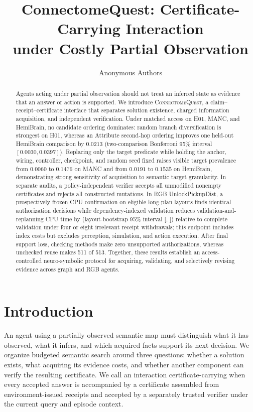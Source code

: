 \documentclass{article}
\title{ConnectomeQuest: Certificate-Carrying Interaction\\under Costly Partial Observation}
\author{Anonymous Authors}
\begin{document}
\maketitle

\begin{abstract}
Agents acting under partial observation should not treat an inferred state as
evidence that an answer or action is supported. We introduce
\textsc{ConnectomeQuest}, a claim--receipt--certificate interface that separates
solution existence, charged information acquisition, and independent
verification. Under matched access on H01, MANC, and HemiBrain, no candidate
ordering dominates: random branch diversification is strongest on H01, whereas
an Attribute second-hop ordering improves one held-out HemiBrain
comparison by $0.0213$ (two-comparison Bonferroni 95\% interval
$[0.0030,0.0397]$). Replacing only the target predicate while holding the
anchor, wiring, controller, checkpoint, and random seed fixed raises visible
target prevalence from $0.0060$ to $0.1476$ on MANC and
from $0.0191$ to $0.1535$ on HemiBrain, demonstrating strong sensitivity of acquisition to semantic target granularity. In separate audits, a policy-independent
verifier accepts all \VerifierReplayCertificates{} unmodified nonempty certificates
and rejects all \VerifierMutationAttempts{} constructed mutations. In RGB
UnlockPickupDist, a prospectively frozen CPU confirmation on
\AmortizedEligible{} eligible long-plan layouts finds identical authorization
decisions while dependency-indexed validation reduces validation-and-replanning
CPU time by \AmortizedReduction{} (layout-bootstrap 95\% interval
[\AmortizedReductionLow{}, \AmortizedReductionHigh{}]) relative to complete
validation under four or eight irrelevant receipt withdrawals; this endpoint
includes index costs but excludes perception, simulation, and action execution. After final
support loss, checking methods make zero unsupported authorizations, whereas
unchecked reuse makes 511 of 513. Together, these results establish an access-controlled neuro-symbolic protocol
for acquiring, validating, and selectively revising evidence across graph and
RGB agents.
\end{abstract}

\section{Introduction}

An agent using a partially observed semantic map must distinguish what it has
observed, what it infers, and which acquired facts support its next decision.
We organize budgeted semantic search around three questions: whether a solution
exists, what acquiring its evidence costs, and whether another component can
verify the resulting certificate.
We call an interaction certificate-carrying when every accepted answer is
accompanied by a certificate assembled from environment-issued receipts and
accepted by a separately trusted verifier under the current query and episode context.
\end{document}
